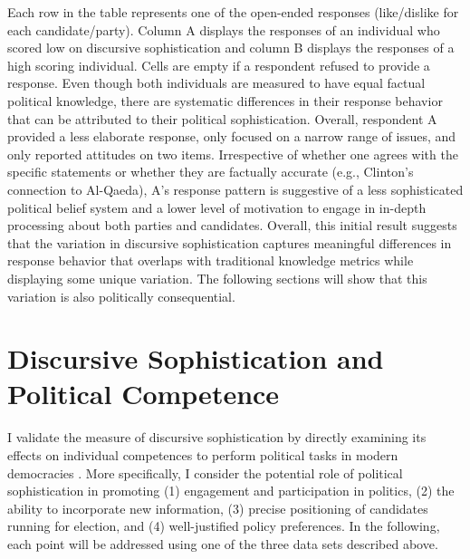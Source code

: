Each row in the table represents one of the open-ended responses (like/dislike for each candidate/party). Column A displays the responses of an individual who scored low on discursive sophistication and column B displays the responses of a high scoring individual. Cells are empty if a respondent refused to provide a response. Even though both individuals are measured to have equal factual political knowledge, there are systematic differences in their response behavior that can be attributed to their political sophistication. Overall, respondent A provided a less elaborate response, only focused on a narrow range of issues, and only reported attitudes on two items. Irrespective of whether one agrees with the specific statements or whether they are factually accurate (e.g., Clinton's connection to Al-Qaeda), A's response pattern is suggestive of a less sophisticated political belief system and a lower level of motivation to engage in in-depth processing about both parties and candidates. Overall, this initial result suggests that the variation in discursive sophistication captures meaningful differences in response behavior that overlaps with traditional knowledge metrics while displaying some unique variation. The following sections will show that this variation is also politically consequential.



\section{Discursive Sophistication and Political Competence}

I validate the measure of discursive sophistication by directly examining its effects on individual competences to perform political tasks in modern democracies \citep[c.f.,][]{lupia2006elitism,lupia2015uninformed}. More specifically, I consider the potential role of political sophistication in promoting (1) engagement and participation in politics, (2) the ability to incorporate new information, (3) precise positioning of candidates running for election, and (4) well-justified policy preferences. In the following, each point will be addressed using one of the three data sets described above.


